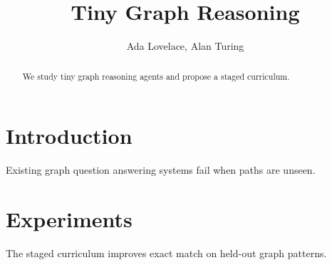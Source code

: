 \documentclass{article}
\title{Tiny Graph Reasoning}
\author{Ada Lovelace, Alan Turing}
\begin{document}
\maketitle
\begin{abstract}
We study tiny graph reasoning agents and propose a staged curriculum.
\end{abstract}

\section{Introduction}
Existing graph question answering systems fail when paths are unseen.

\section{Experiments}
The staged curriculum improves exact match on held-out graph patterns.
\end{document}
